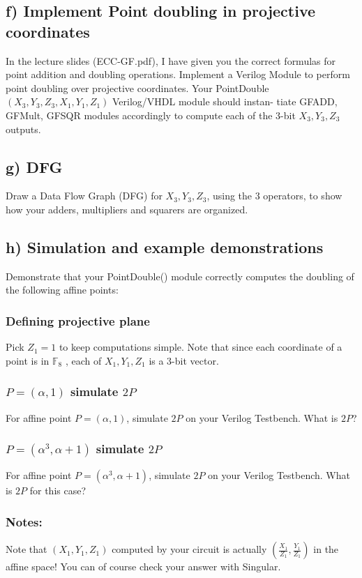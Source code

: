 \documentclass[a4paper,11pt]{exam}
\begin{document}
\subsection{f) Implement Point doubling in projective coordinates}
\label{sec:orgd0213ee}
In the lecture slides (ECC-GF.pdf), I have given you the correct formulas for point addition
and doubling operations. Implement a Verilog Module to perform point doubling over projective
coordinates. Your PointDouble\((X_3,Y_3,Z_3,X_1,Y_1,Z_1)\) Verilog/VHDL module should instan-
tiate GFADD, GFMult, GFSQR modules accordingly to compute each of the 3-bit \(X_3, Y_3, Z_3\)
outputs.

\subsection{g) DFG}
\label{sec:orgfeb249a}
Draw a Data Flow Graph (DFG) for \(X_3, Y_3, Z_3\), using the 3 operators, to show how your
adders, multipliers and squarers are organized.

\subsection{h) Simulation and example demonstrations}
\label{sec:orge2dfc6f}
 Demonstrate that your PointDouble() module correctly computes the doubling of the
following affine points:

\subsubsection{Defining projective plane}
\label{sec:orgb8fd7ec}
Pick \(Z_1 = 1\) to keep computations simple. Note that since each coordinate of a point is
in \(\mathbb{F}_8\) , each of \(X_1, Y_1, Z_1\) is a 3-bit vector.

\subsubsection{\(P = (\alpha, 1)\) simulate \(2P\)}
\label{sec:orgc66fb16}
For affine point \(P = (\alpha, 1)\), simulate \(2P\) on your Verilog Testbench. What is \(2P\)?
\subsubsection{\(P = (\alpha^3, \alpha + 1)\) simulate \(2P\)}
\label{sec:orgd6c437e}
For affine point \(P = (\alpha^3, \alpha + 1)\), simulate \(2P\) on your Verilog Testbench. What is \(2P\) for
this case?
\subsubsection{Notes:}
\label{sec:org024a86e}
Note that \((X_1 , Y_1 , Z_1 )\) computed by your circuit is actually \((\frac{X_1}{Z_1}, \frac{Y_1}{Z_1})\) in the affine
space! You can of course check your answer with Singular.
\end{document}
